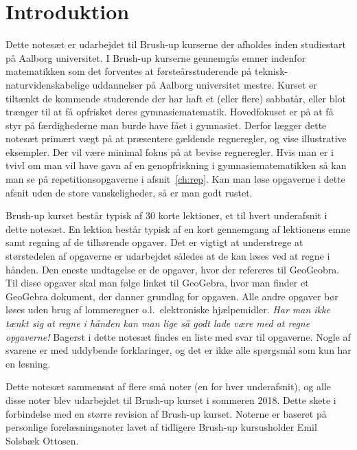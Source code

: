 \chapter*{Introduktion}\normalsize
Dette notesæt er udarbejdet til Brush-up kurserne der afholdes inden studiestart på Aalborg universitet. I Brush-up kurserne gennemgås emner indenfor matematikken som det forventes at førsteårsstuderende på teknisk-naturvidenskabelige uddannelser på Aalborg universitet mestre. Kurset er tiltænkt de kommende studerende der har haft et (eller flere) sabbatår, eller blot trænger til at få opfrisket deres gymnasiematematik. Hovedfokuset er på at få styr på færdighederne man burde have fået i gymnasiet. Derfor lægger dette notesæt primært vægt på at præsentere gældende regneregler, og vise illustrative eksempler. Der vil være minimal fokus på at bevise regneregler. Hvis man er i tvivl om man vil have gavn af en genopfriskning i gymnasiematematikken så kan man se på repetitionsopgaverne i afsnit~\ref{ch:rep}. Kan man løse opgaverne i dette afsnit uden de store vanskeligheder, så er man godt rustet.

Brush-up kurset består typisk af 30 korte lektioner, et til hvert underafsnit i dette notesæt. En lektion består typisk af en kort gennemgang af lektionens emne samt regning af de tilhørende opgaver. Det er vigtigt at understrege at størstedelen af opgaverne er udarbejdet således at de kan løses ved at regne i hånden. Den eneste undtagelse er de opgaver, hvor der refereres til GeoGeobra. Til disse opgaver skal man følge linket til GeoGebra, hvor man finder et GeoGebra dokument, der danner grundlag for opgaven. Alle andre opgaver bør løses uden brug af lommeregner o.l.\ elektroniske hjælpemidler. \emph{Har man ikke tænkt sig at regne i hånden kan man lige så godt lade være med at regne opgaverne!} Bagerst i dette notesæt findes en liste med svar til opgaverne. Nogle af svarene er med uddybende forklaringer, og det er ikke alle spørgsmål som kun har en løsning.

Dette notesæt sammensat af flere små noter (en for hver underafsnit), og alle disse noter blev udarbejdet til Brush-up kurset i sommeren 2018. Dette skete i forbindelse med en større revision af Brush-up kurset. Noterne er baseret på personlige forelæsningsnoter lavet af tidligere Brush-up kursusholder Emil Solsbæk Ottosen. 


\pagestyle{fancy}
